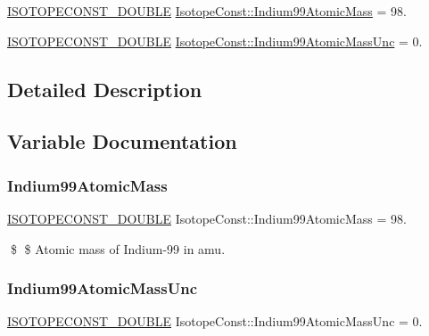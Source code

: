 \begin{DoxyCompactItemize}
\item 
\mbox{\hyperlink{group___isotope_const-_macros_ga8f45a7272ce02c0b4c65c44636ed719a}{I\+S\+O\+T\+O\+P\+E\+C\+O\+N\+S\+T\+\_\+\+D\+O\+U\+B\+LE}} \mbox{\hyperlink{group___isotope_const-_indium-_in99_ga471878f054e826851390d83dfee2dfb6}{Isotope\+Const\+::\+Indium99\+Atomic\+Mass}} = 98.
\item 
\mbox{\hyperlink{group___isotope_const-_macros_ga8f45a7272ce02c0b4c65c44636ed719a}{I\+S\+O\+T\+O\+P\+E\+C\+O\+N\+S\+T\+\_\+\+D\+O\+U\+B\+LE}} \mbox{\hyperlink{group___isotope_const-_indium-_in99_ga5d5b583550ce60bbdf08342286126b89}{Isotope\+Const\+::\+Indium99\+Atomic\+Mass\+Unc}} = 0.
\end{DoxyCompactItemize}


\subsection{Detailed Description}


\subsection{Variable Documentation}
\mbox{\label{group___isotope_const-_indium-_in99_ga471878f054e826851390d83dfee2dfb6}} 
\subsubsection{\texorpdfstring{Indium99\+Atomic\+Mass}{Indium99AtomicMass}}
{\footnotesize\ttfamily \mbox{\hyperlink{group___isotope_const-_macros_ga8f45a7272ce02c0b4c65c44636ed719a}{I\+S\+O\+T\+O\+P\+E\+C\+O\+N\+S\+T\+\_\+\+D\+O\+U\+B\+LE}} Isotope\+Const\+::\+Indium99\+Atomic\+Mass = 98.}

\$ \$ Atomic mass of Indium-\/99 in amu. \mbox{\label{group___isotope_const-_indium-_in99_ga5d5b583550ce60bbdf08342286126b89}} 
\subsubsection{\texorpdfstring{Indium99\+Atomic\+Mass\+Unc}{Indium99AtomicMassUnc}}
{\footnotesize\ttfamily \mbox{\hyperlink{group___isotope_const-_macros_ga8f45a7272ce02c0b4c65c44636ed719a}{I\+S\+O\+T\+O\+P\+E\+C\+O\+N\+S\+T\+\_\+\+D\+O\+U\+B\+LE}} Isotope\+Const\+::\+Indium99\+Atomic\+Mass\+Unc = 0.}


